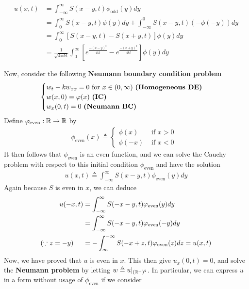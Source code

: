 \documentclass{report}
\begin{document}
\begin{mdframed}
\begin{align*}
u(x,t)&=\int_{-\infty}^{\infty}S(x-y,t)\phi_{\operatorname{odd}}(y)dy\\
&=\int_{0}^{\infty}S(x-y,t)\phi (y)dy + \int_{-\infty}^0S(x-y,t)(-\phi (-y))dy\\
&=\int_0^{\infty} [S(x-y,t)-S(x+y,t)]\phi (y)dy \\
&=\frac{1}{\sqrt{4\pi kt}}\int_0^{\infty} [e^{\frac{-(x-y)^2}{4kt}}- e^{\frac{-(x+y)^2}{4kt}}]\phi (y)dy 
\end{align*}

\end{mdframed}
\begin{mdframed}

Now, consider the following \textbf{Neumann boundary condition problem}
\begin{align*}
\begin{cases}
  w_t-kw_{xx}=0\text{ for }x\in (0,\infty)\text{ \textbf{(Homogeneous DE)} }\\
  w(x,0)=\phi (x)\text{ \textbf{(IC)} }\\
  w_x(0,t)=0\text{ \textbf{(Neumann BC)} }
\end{cases}
\end{align*}
Define $\phi_{\operatorname{even}}:\R\rightarrow \R$ by   
\begin{align*}
\phi_{\operatorname{even}}(x)\triangleq \begin{cases}
  \phi (x)& \text{ if $x> 0$ }\\
  \phi (-x)& \text{ if $x< 0$ }
\end{cases}
\end{align*}
It then follows that $\phi_{\operatorname{even}}$ is an even function, and we can solve the Cauchy problem with respect to this initial condition $\phi_{\operatorname{even}}$ and have the solution 
\begin{align*}
u(x,t)\triangleq \int_{-\infty}^{\infty}S(x-y,t)\phi_{\operatorname{even}}(y)dy
\end{align*}
Again because $S$ is even in $x$, we can deduce 
 \begin{align*}
u(-x,t)&=\int_{-\infty}^{\infty}S(-x-y,t)\phi_{\operatorname{even}}(y)dy \\
&=\int_{-\infty}^{\infty}S(-x-y,t)\phi_{\operatorname{even}}(-y)dy \\
(\because z=-y)\hspace{0.5cm}&=-\int_{\infty}^{-\infty} S(-x+z,t)\phi_{\operatorname{even}}(z)dz=u(x,t)
\end{align*}
Now, we have proved that $u$ is even in $x$. This then give $u_x(0,t)=0$, and solve the \textbf{Neumann problem} by letting $w\triangleq u|_{(\R^+)^2}$. In particular, we can express $u$ in a form without usage of  $\phi_{\operatorname{even}}$ if we consider 

\end{mdframed}
\end{document}
